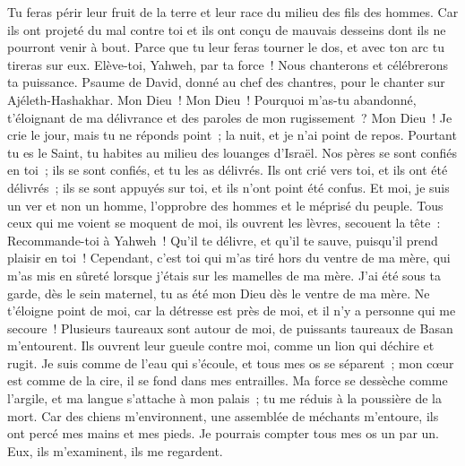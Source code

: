 \begin{multicols}{2}
Tu feras périr leur fruit de la terre et leur race du milieu des fils des hommes.
Car ils ont projeté du mal contre toi et ils ont conçu de mauvais desseins dont ils ne pourront venir à bout.
Parce que tu leur feras tourner le dos, et avec ton arc tu tireras sur eux.
Elève-toi, Yahweh, par ta force~! Nous chanterons et célébrerons ta puissance.
\VerseOne{}Psaume de David, donné au chef des chantres, pour le chanter sur Ajéleth-Hashakhar.
Mon Dieu~! Mon Dieu~! Pourquoi m'as-tu abandonné, t'éloignant de ma délivrance et des paroles de mon rugissement~?
Mon Dieu~! Je crie le jour, mais tu ne réponds point~; la nuit, et je n'ai point de repos.
Pourtant tu es le Saint, tu habites au milieu des louanges d'Israël.
Nos pères se sont confiés en toi~; ils se sont confiés, et tu les as délivrés.
Ils ont crié vers toi, et ils ont été délivrés~; ils se sont appuyés sur toi, et ils n'ont point été confus.
Et moi, je suis un ver et non un homme, l'opprobre des hommes et le méprisé du peuple.
Tous ceux qui me voient se moquent de moi, ils ouvrent les lèvres, secouent la tête~:
Recommande-toi à Yahweh~! Qu'il te délivre, et qu'il te sauve, puisqu'il prend plaisir en toi~!
Cependant, c'est toi qui m'as tiré hors du ventre de ma mère, qui m'as mis en sûreté lorsque j'étais sur les mamelles de ma mère.
J'ai été sous ta garde, dès le sein maternel, tu as été mon Dieu dès le ventre de ma mère.
Ne t'éloigne point de moi, car la détresse est près de moi, et il n'y a personne qui me secoure~!
Plusieurs taureaux sont autour de moi, de puissants taureaux de Basan m'entourent.
Ils ouvrent leur gueule contre moi, comme un lion qui déchire et rugit.
Je suis comme de l'eau qui s'écoule, et tous mes os se séparent~; mon cœur est comme de la cire, il se fond dans mes entrailles.
Ma force se dessèche comme l'argile, et ma langue s'attache à mon palais~; tu me réduis à la poussière de la mort.
Car des chiens m'environnent, une assemblée de méchants m'entoure, ils ont percé mes mains et mes pieds.
Je pourrais compter tous mes os un par un. Eux, ils m'examinent, ils me regardent.

\end{multicols}
